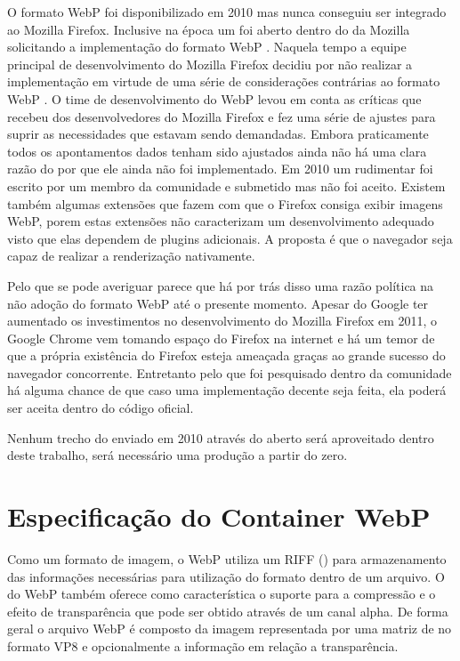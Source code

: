 \documentclass[espaco=simples,appendix=Name]{abnt}
\begin{document}
\begin{description}
O formato WebP foi disponibilizado em 2010 mas nunca conseguiu ser integrado ao Mozilla Firefox. Inclusive na época um  foi aberto dentro do  da Mozilla solicitando a implementação do formato WebP \cite{FirefoxBug}. Naquela tempo a equipe principal de desenvolvimento do Mozilla Firefox decidiu por não realizar a implementação em virtude de uma série de considerações contrárias ao formato WebP \cite{WebPCritica}. O time de desenvolvimento do WebP levou em conta as críticas que recebeu dos desenvolvedores do Mozilla Firefox e fez uma série de ajustes para suprir as necessidades que estavam sendo demandadas. Embora praticamente todos os apontamentos dados tenham sido ajustados ainda não há uma clara razão do por que ele ainda não foi implementado. Em 2010 um  rudimentar foi escrito por um membro da comunidade e submetido mas não foi aceito. Existem também algumas extensões que fazem com que o Firefox consiga exibir imagens WebP, porem estas extensões não caracterizam um desenvolvimento adequado visto que elas dependem de plugins adicionais. A proposta é que o navegador seja capaz de realizar a renderização nativamente.

Pelo que se pode averiguar parece que há por trás disso uma razão política na não adoção do formato WebP até o presente momento. Apesar do Google ter aumentado os investimentos no desenvolvimento do Mozilla Firefox em 2011, o Google Chrome vem tomando espaço do Firefox na internet e há um temor de que a própria existência do Firefox esteja ameaçada graças ao grande sucesso do navegador concorrente. Entretanto pelo que foi pesquisado dentro da comunidade há alguma chance de que caso uma implementação decente seja feita, ela poderá ser aceita dentro do código oficial.

Nenhum trecho do  enviado em 2010 através do  aberto será aproveitado dentro deste trabalho, será necessário uma produção a partir do zero.

\section{Especificação do Container WebP}

\item \noindent

Como um formato de imagem, o WebP utiliza um  RIFF () para armazenamento das informações necessárias para utilização do formato dentro de um arquivo. O  do WebP também oferece como característica o suporte para a compressão  e o efeito de transparência que pode ser obtido através de um canal alpha. De forma geral o arquivo WebP é composto da imagem representada por uma matriz de  no formato VP8 e opcionalmente a informação em relação a transparência.


\end{description}
\end{document}
